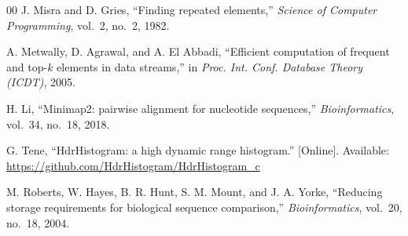\documentclass[conference]{IEEEtran}
\begin{document}
\begin{thebibliography}{00}
 J. Misra and D. Gries, ``Finding repeated elements,'' \emph{Science of
Computer Programming}, vol.~2, no.~2, 1982.

 A. Metwally, D. Agrawal, and A. El Abbadi, ``Efficient computation of
frequent and top-$k$ elements in data streams,'' in \emph{Proc. Int. Conf. Database Theory
(ICDT)}, 2005.

 H. Li, ``Minimap2: pairwise alignment for nucleotide sequences,''
\emph{Bioinformatics}, vol.~34, no.~18, 2018.

 G. Tene, ``HdrHistogram: a high dynamic range histogram.'' [Online].
Available: \url{https://github.com/HdrHistogram/HdrHistogram_c}

 M. Roberts, W. Hayes, B. R. Hunt, S. M. Mount, and J. A. Yorke,
``Reducing storage requirements for biological sequence comparison,''
\emph{Bioinformatics}, vol.~20, no.~18, 2004.

\end{thebibliography}
\end{document}
